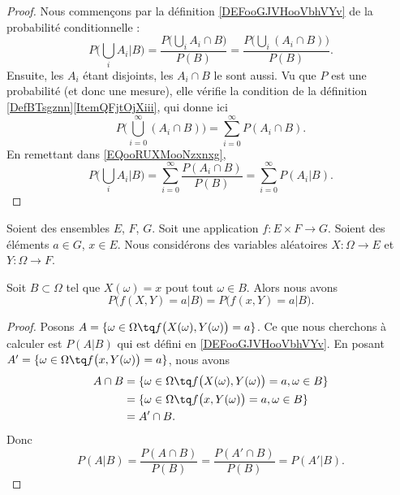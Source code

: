 \begin{proof}
	Nous commençons par la définition \ref{DEFooGJVHooVbhVYv} de la probabilité conditionnelle :
	\begin{equation}        \label{EQooRUXMooNzxnxg}
		P\big( \bigcup_iA_i|B \big)=\frac{ P\big( \bigcup_iA_i\cap B \big) }{ P(B) }=\frac{ P\big( \bigcup_i(A_i\cap B) \big) }{ P(B) }.
	\end{equation}
	Ensuite, les \( A_i\) étant disjoints, les \( A_i\cap B\) le sont aussi. Vu que \( P\) est une probabilité (et donc une mesure), elle vérifie la condition de la définition \ref{DefBTsgznn}\ref{ItemQFjtOjXiii}, qui donne ici
	\begin{equation}
		P\big( \bigcup_{i=0}^{\infty}(A_i\cap B) \big)=\sum_{i=0}^{\infty}P(A_i\cap B).
	\end{equation}
	En remettant dans \eqref{EQooRUXMooNzxnxg},
	\begin{equation}
		P\big( \bigcup_iA_i|B \big)=\sum_{i=0}^{\infty}\frac{ P(A_i\cap B) }{ P(B) }=\sum_{i=0}^{\infty}P(A_i|B).
	\end{equation}
\end{proof}

\begin{lemma}       \label{LEMooVYDTooGELPRY}
	Soient des ensembles \( E\), \( F\), \( G\). Soit une application \( f\colon E\times F\to G\). Soient des éléments \( a\in G\), \( x\in E\). Nous considérons des variables aléatoires \( X\colon \Omega\to E\) et \( Y\colon \Omega\to F\).

	Soit \( B\subset \Omega\) tel que \( X(\omega)=x\) pout tout \( \omega\in B\). Alors nous avons
	\begin{equation}
		P\big( f(X,Y)=a|B \big)=P\big( f(x,Y)=a|B \big).
	\end{equation}
\end{lemma}

\begin{proof}
	Posons \( A=\{ \omega\in \Omega\tq f\big( X(\omega),Y(\omega) \big)=a \}\). Ce que nous cherchons à calculer est \( P(A|B)\) qui est défini en \ref{DEFooGJVHooVbhVYv}. En posant \(  A'=\{ \omega\in\Omega\tq f\big( x,Y(\omega) \big)=a \} \),  nous avons
	\begin{subequations}
		\begin{align}
			A\cap B & =\{ \omega\in \Omega\tq f\big( X(\omega),Y(\omega) \big)=a, \omega\in B \} \\
			        & =\{ \omega\in\Omega\tq f\big( x,Y(\omega) \big)=a,\omega\in B \}           \\
			        & =A'\cap B.
		\end{align}
	\end{subequations}
	Donc
	\begin{equation}
		P(A|B)=\frac{ P(A\cap B) }{ P(B) }=\frac{ P(A'\cap B) }{ P(B) }=P(A'|B).
	\end{equation}
\end{proof}


